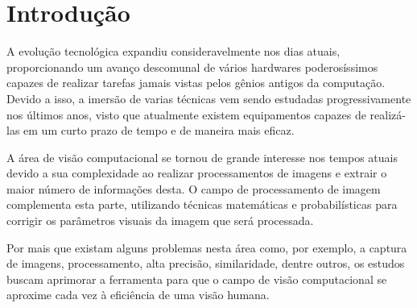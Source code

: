\chapter{Introdução}
\label{chapter:introducao}

A evolução tecnológica expandiu consideravelmente nos dias atuais, proporcionando um avanço descomunal de vários hardwares poderosíssimos capazes de realizar tarefas jamais vistas pelos gênios antigos da computação. Devido a isso, a imersão de varias técnicas vem sendo estudadas progressivamente nos últimos anos, visto que atualmente existem equipamentos capazes de realizá-las em um curto prazo de tempo e de maneira mais eficaz.

A área de visão computacional se tornou de grande interesse nos tempos atuais devido a sua complexidade ao realizar processamentos de imagens e extrair o maior número de informações desta. O campo de processamento de imagem complementa esta parte, utilizando técnicas matemáticas e probabilísticas para corrigir os parâmetros visuais da imagem que será processada.

Por mais que existam alguns problemas nesta área como, por exemplo, a captura de imagens, processamento, alta precisão, similaridade, dentre outros, os estudos buscam aprimorar a ferramenta para que o campo de visão computacional se aproxime cada vez à eficiência de uma visão humana.


%



